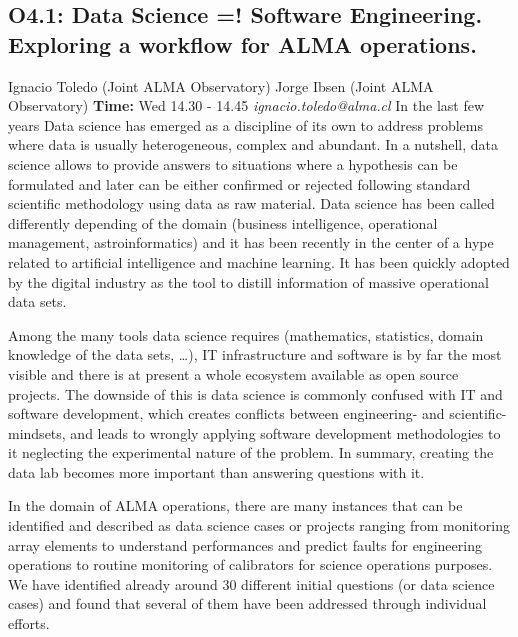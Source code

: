 \documentclass{report}
\begin{document}
\subsection*{O4.1: Data Science =! Software Engineering. Exploring a workflow for ALMA operations.}
\bigskip
Ignacio Toledo (Joint ALMA Observatory) \newline Jorge Ibsen (Joint ALMA Observatory) \newline   \newline   \newline  \newline  \newline\newline
{\bf Time:} Wed 14.30 - 14.45\newline
\newline
{\it ignacio.toledo@alma.cl}\newline
\newline\newline
In the last few years Data science has emerged as a discipline of its own to address problems where data is usually heterogeneous, complex and abundant. In a nutshell, data science allows to provide answers to situations where a hypothesis can be formulated and later can be either confirmed or rejected following standard scientific methodology using data as raw material. Data science has been called differently depending of the domain (business intelligence, operational management, astroinformatics) and it has been recently in the center of a hype related to artificial intelligence and machine learning. It has been quickly adopted by the digital industry as the tool to distill information of massive operational data sets.

Among the many tools data science requires (mathematics, statistics, domain knowledge of the data sets, …), IT infrastructure and software is by far the most visible and there is at present a whole ecosystem available as open source projects. The downside of this is data science is commonly confused with IT and software development, which creates conflicts between engineering- and scientific- mindsets, and leads to wrongly applying software development methodologies to it neglecting the experimental nature of the problem. In summary, creating the data lab becomes more important than answering questions with it.

In the domain of ALMA operations, there are many instances that can be identified and described as data science cases or projects ranging from monitoring array elements to understand performances and predict faults for engineering operations to routine monitoring of calibrators for science operations purposes. We have identified already around 30 different initial questions (or data science cases) and found that several of them have been addressed through individual efforts. 
\end{document}
